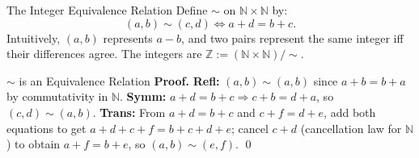 \documentclass[12pt, openany]{book}
\theoremstyle{plain}
\theoremstyle{definition}
\theoremstyle{remark}
\newcommand{\N}{\mathbb{N}}
\newcommand{\Z}{\mathbb{Z}}
\begin{document}
\begin{center}
\end{center}

\begin{defbox}{The Integer Equivalence Relation}
Define $\sim$ on $\N \times \N$ by:
\[ (a, b) \sim (c, d) \iff a + d = b + c. \]
Intuitively, $(a,b)$ represents $a - b$, and two pairs represent the same integer iff their differences agree.
The integers are $\Z := (\N \times \N)/{\sim}$.
\end{defbox}
\color{black}

\begin{thmbox}{$\sim$ is an Equivalence Relation}
\textbf{Proof.}
\textbf{Refl:} $(a,b)\sim(a,b)$ since $a+b=b+a$ by commutativity in $\N$.
\textbf{Symm:} $a+d=b+c \Rightarrow c+b=d+a$, so $(c,d)\sim(a,b)$.
\textbf{Trans:} From $a+d=b+c$ and $c+f=d+e$, add both equations to get
$a+d+c+f=b+c+d+e$; cancel $c+d$ (cancellation law for $\N$) to obtain
$a+f=b+e$, so $(a,b)\sim(e,f)$. \qed
\end{thmbox}
\end{document}

